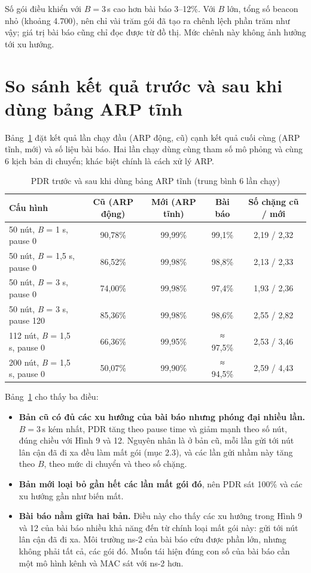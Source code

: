 \documentclass[a4paper,13pt]{extreport}
\begin{document}
Số gói điều khiển với $B = 3$\,s cao hơn bài báo 3--12\%. Với $B$ lớn, tổng số beacon nhỏ (khoảng 4.700), nên chỉ vài trăm gói đã tạo ra chênh lệch phần trăm như vậy; giá trị bài báo cũng chỉ đọc được từ đồ thị. Mức chênh này không ảnh hưởng tới xu hướng.

\section{So sánh kết quả trước và sau khi dùng bảng ARP tĩnh}

Bảng~\ref{tab:oldnew} đặt kết quả lần chạy đầu (ARP động, cũ) cạnh kết quả cuối cùng (ARP tĩnh, mới) và số liệu bài báo. Hai lần chạy dùng cùng tham số mô phỏng và cùng 6 kịch bản di chuyển; khác biệt chính là cách xử lý ARP.

\begin{table}[H]
\centering
\caption{PDR trước và sau khi dùng bảng ARP tĩnh (trung bình 6 lần chạy)}
\label{tab:oldnew}
\begin{tabular}{lcccc}
\toprule
Cấu hình & Cũ (ARP động) & Mới (ARP tĩnh) & Bài báo & Số chặng cũ / mới\\
\midrule
50 nút, \textit{B} = 1 s, pause 0 & 90,78\% & 99,99\% & 99,1\% & 2,19 / 2,32\\
50 nút, \textit{B} = 1,5 s, pause 0 & 86,52\% & 99,98\% & 98,8\% & 2,13 / 2,33\\
50 nút, \textit{B} = 3 s, pause 0 & 74,00\% & 99,98\% & 97,4\% & 1,93 / 2,36\\
50 nút, \textit{B} = 3 s, pause 120 & 85,36\% & 99,98\% & 98,6\% & 2,55 / 2,82\\
112 nút, \textit{B} = 1,5 s, pause 0 & 66,36\% & 99,95\% & ≈ 97,5\% & 2,53 / 3,46\\
200 nút, \textit{B} = 1,5 s, pause 0 & 50,07\% & 99,90\% & ≈ 94,5\% & 2,59 / 4,43\\
\bottomrule
\end{tabular}
\end{table}

Bảng~\ref{tab:oldnew} cho thấy ba điều:
\begin{itemize}
  \item \textbf{Bản cũ có đủ các xu hướng của bài báo nhưng phóng đại nhiều lần.} $B = 3$\,s kém nhất, PDR tăng theo pause time và giảm mạnh theo số nút, đúng chiều với Hình 9 và 12. Nguyên nhân là ở bản cũ, mỗi lần gửi tới nút lân cận đã đi xa đều làm mất gói (mục 2.3), và các lần gửi nhầm này tăng theo $B$, theo mức di chuyển và theo số chặng.
  \item \textbf{Bản mới loại bỏ gần hết các lần mất gói đó}, nên PDR sát 100\% và các xu hướng gần như biến mất.
  \item \textbf{Bài báo nằm giữa hai bản.} Điều này cho thấy các xu hướng trong Hình 9 và 12 của bài báo nhiều khả năng đến từ chính loại mất gói này: gửi tới nút lân cận đã đi xa. Môi trường ns-2 của bài báo cứu được phần lớn, nhưng không phải tất cả, các gói đó. Muốn tái hiện đúng con số của bài báo cần một mô hình kênh và MAC sát với ns-2 hơn.
\end{itemize}
\end{document}

